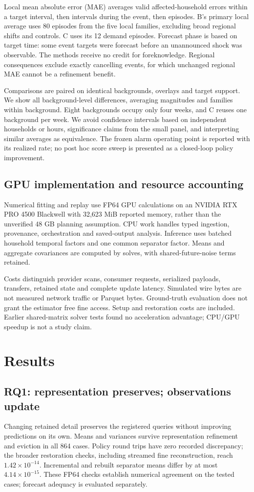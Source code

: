 \documentclass[conference]{IEEEtran}
\begin{document}
Local mean absolute error (MAE) averages valid affected-household errors within a target interval, then intervals during the event, then episodes. B's primary local average uses 80 episodes from the five local families, excluding broad regional shifts and controls. C uses its 12 demand episodes. Forecast phase is based on target time: some event targets were forecast before an unannounced shock was observable. The methods receive no credit for foreknowledge. Regional consequences exclude exactly cancelling events, for which unchanged regional MAE cannot be a refinement benefit.

Comparisons are paired on identical backgrounds, overlays and target support. We show all background-level differences, averaging magnitudes and families within background. Eight backgrounds occupy only four weeks, and C reuses one background per week. We avoid confidence intervals based on independent households or hours, significance claims from the small panel, and interpreting similar averages as equivalence. The frozen alarm operating point is reported with its realized rate; no post hoc score sweep is presented as a closed-loop policy improvement.

\subsection{GPU implementation and resource accounting}
Numerical fitting and replay use FP64 GPU calculations on an NVIDIA RTX PRO 4500 Blackwell with 32,623 MiB reported memory, rather than the unverified 48 GB planning assumption. CPU work handles typed ingestion, provenance, orchestration and saved-output analysis. Inference uses batched household temporal factors and one common separator factor. Means and aggregate covariances are computed by solves, with shared-future-noise terms retained.

Costs distinguish provider scans, consumer requests, serialized payloads, transfers, retained state and complete update latency. Simulated wire bytes are not measured network traffic or Parquet bytes. Ground-truth evaluation does not grant the estimator free fine access. Setup and restoration costs are included. Earlier shared-matrix solver tests found no acceleration advantage; CPU/GPU speedup is not a study claim.

\section{Results}
\subsection{RQ1: representation preserves; observations update}
Changing retained detail preserves the registered queries without improving predictions on its own. Means and variances survive representation refinement and eviction in all 864 cases. Policy round trips have zero recorded discrepancy; the broader restoration checks, including streamed fine reconstruction, reach $1.42\times10^{-14}$. Incremental and rebuilt separator means differ by at most $4.14\times10^{-15}$. These FP64 checks establish numerical agreement on the tested cases; forecast adequacy is evaluated separately.
\end{document}
